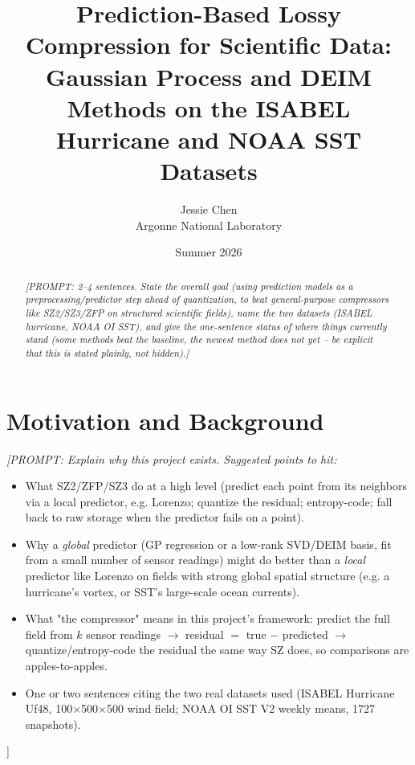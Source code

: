 \documentclass[11pt]{article}
\title{Prediction-Based Lossy Compression for Scientific Data:\\
       Gaussian Process and DEIM Methods on the ISABEL Hurricane and NOAA SST Datasets}
\author{Jessie Chen \\ Argonne National Laboratory}
\date{Summer 2026}
\newcommand{\prompt}[1]{{\color{red}\itshape [PROMPT: #1]}\par\medskip}
\begin{document}
\maketitle

\begin{abstract}
\prompt{2--4 sentences. State the overall goal (using prediction models
as a preprocessing/predictor step ahead of quantization, to beat
general-purpose compressors like SZ2/SZ3/ZFP on structured scientific
fields), name the two datasets (ISABEL hurricane, NOAA OI SST), and
give the one-sentence status of where things currently stand
(some methods beat the baseline, the newest method does not yet --
be explicit that this is stated plainly, not hidden).}
\end{abstract}

\section{Motivation and Background}
\label{sec:motivation}

\prompt{Explain why this project exists. Suggested points to hit:
\begin{itemize}
  \item What SZ2/ZFP/SZ3 do at a high level (predict each point from
        its neighbors via a local predictor, e.g. Lorenzo; quantize the
        residual; entropy-code; fall back to raw storage when the
        predictor fails on a point).
  \item Why a \emph{global} predictor (GP regression or a low-rank
        SVD/DEIM basis, fit from a small number of sensor readings)
        might do better than a \emph{local} predictor like Lorenzo on
        fields with strong global spatial structure (e.g. a hurricane's
        vortex, or SST's large-scale ocean currents).
  \item What "the compressor" means in this project's framework:
        predict the full field from $k$ sensor readings $\to$ residual
        $=$ true $-$ predicted $\to$ quantize/entropy-code the residual
        the same way SZ does, so comparisons are apples-to-apples.
  \item One or two sentences citing the two real datasets used
        (ISABEL Hurricane Uf48, 100$\times$500$\times$500 wind field;
        NOAA OI SST V2 weekly means, 1727 snapshots).
\end{itemize}}
\end{document}
